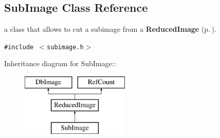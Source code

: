 \subsection{Sub\-Image  Class Reference}
\label{class_subimage}
a class that allows to cut a subimage from a {\bf Reduced\-Image} {\rm (p.\,\pageref{class_reducedimage})}. 


{\tt \#include $<$subimage.h$>$}

Inheritance diagram for Sub\-Image::\begin{figure}[H]
\begin{center}
\leavevmode
\includegraphics[height=3cm]{class_subimage}
\end{center}
\end{figure}
